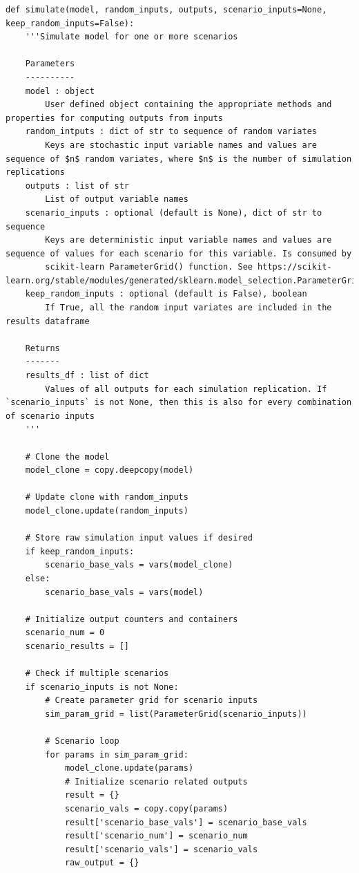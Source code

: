 \documentclass[ited]{informs3}                      %
\begin{document}
\begin{listing}
\centering
\begin{verbatim}
def simulate(model, random_inputs, outputs, scenario_inputs=None, keep_random_inputs=False):
    '''Simulate model for one or more scenarios

    Parameters
    ----------
    model : object
        User defined object containing the appropriate methods and properties for computing outputs from inputs
    random_intputs : dict of str to sequence of random variates
        Keys are stochastic input variable names and values are sequence of $n$ random variates, where $n$ is the number of simulation replications
    outputs : list of str
        List of output variable names
    scenario_inputs : optional (default is None), dict of str to sequence
        Keys are deterministic input variable names and values are sequence of values for each scenario for this variable. Is consumed by
        scikit-learn ParameterGrid() function. See https://scikit-learn.org/stable/modules/generated/sklearn.model_selection.ParameterGrid.html
    keep_random_inputs : optional (default is False), boolean
        If True, all the random input variates are included in the results dataframe

    Returns
    -------
    results_df : list of dict
        Values of all outputs for each simulation replication. If `scenario_inputs` is not None, then this is also for every combination of scenario inputs
    '''
    
    # Clone the model
    model_clone = copy.deepcopy(model)
    
    # Update clone with random_inputs
    model_clone.update(random_inputs)
    
    # Store raw simulation input values if desired
    if keep_random_inputs:
        scenario_base_vals = vars(model_clone)
    else:
        scenario_base_vals = vars(model)
    
    # Initialize output counters and containers
    scenario_num = 0
    scenario_results = []
    
    # Check if multiple scenarios
    if scenario_inputs is not None:
        # Create parameter grid for scenario inputs
        sim_param_grid = list(ParameterGrid(scenario_inputs))
        
        # Scenario loop
        for params in sim_param_grid:
            model_clone.update(params)
            # Initialize scenario related outputs
            result = {}
            scenario_vals = copy.copy(params)
            result['scenario_base_vals'] = scenario_base_vals
            result['scenario_num'] = scenario_num
            result['scenario_vals'] = scenario_vals
            raw_output = {}
            

\end{verbatim}
\end{listing}
\end{document}

